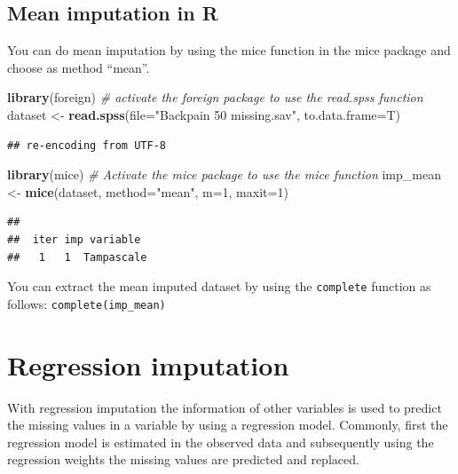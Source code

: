 \documentclass[
]{book}
\newenvironment{Shaded}{\begin{snugshade}}{\end{snugshade}}
\newcommand{\CommentTok}[1]{\textcolor[rgb]{0.56,0.35,0.01}{\textit{#1}}}
\newcommand{\DataTypeTok}[1]{\textcolor[rgb]{0.13,0.29,0.53}{#1}}
\newcommand{\DecValTok}[1]{\textcolor[rgb]{0.00,0.00,0.81}{#1}}
\newcommand{\KeywordTok}[1]{\textcolor[rgb]{0.13,0.29,0.53}{\textbf{#1}}}
\newcommand{\NormalTok}[1]{#1}
\newcommand{\StringTok}[1]{\textcolor[rgb]{0.31,0.60,0.02}{#1}}
\begin{document}
\hypertarget{mean-imputation-in-r}{%
\subsection{Mean imputation in R}\label{mean-imputation-in-r}}

You can do mean imputation by using the mice function in the mice
package and choose as method ``mean''.

\begin{Shaded}
\begin{Highlighting}[]
\KeywordTok{library}\NormalTok{(foreign) }\CommentTok{# activate the foreign package to use the read.spss function}
\NormalTok{dataset <-}\StringTok{ }\KeywordTok{read.spss}\NormalTok{(}\DataTypeTok{file=}\StringTok{"Backpain 50 missing.sav"}\NormalTok{, }\DataTypeTok{to.data.frame=}\NormalTok{T)}
\end{Highlighting}
\end{Shaded}

\begin{verbatim}
## re-encoding from UTF-8
\end{verbatim}

\begin{Shaded}
\begin{Highlighting}[]
\KeywordTok{library}\NormalTok{(mice) }\CommentTok{# Activate the mice package to use the mice function}
\NormalTok{imp_mean <-}\StringTok{ }\KeywordTok{mice}\NormalTok{(dataset, }\DataTypeTok{method=}\StringTok{"mean"}\NormalTok{, }\DataTypeTok{m=}\DecValTok{1}\NormalTok{, }\DataTypeTok{maxit=}\DecValTok{1}\NormalTok{)}
\end{Highlighting}
\end{Shaded}

\begin{verbatim}
## 
##  iter imp variable
##   1   1  Tampascale
\end{verbatim}

You can extract the mean imputed dataset by using the \texttt{complete}
function as follows: \texttt{complete(imp\_mean)}

\hypertarget{regression-imputation}{%
\section{Regression imputation}\label{regression-imputation}}

With regression imputation the information of other variables is used to
predict the missing values in a variable by using a regression model.
Commonly, first the regression model is estimated in the observed data
and subsequently using the regression weights the missing values are
predicted and replaced.
\end{document}
